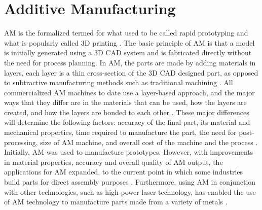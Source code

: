 \section{Additive Manufacturing}
\gls{AM} is the formalized termed for what used to be called rapid prototyping 
and what is popularly called 3D printing \cite{gibson_additive_2014}. 
The basic principle of \gls{AM} is that a model is initially generated using a
\gls{3D CAD} system and is fabricated directly without the need for process 
planning. 
In \gls{AM}, the parts are made by adding materials in layers, each layer is a 
thin cross-section of the \gls{3D CAD} designed part, as opposed 
to subtractive manufacturing methods such as traditional machining
\cite{standard_standard_2012}. 
All commercialized \gls{AM} machines to date use a layer-based approach, and 
the major ways that they differ are in the materials that can be used, 
how the layers are created, and how the layers are bonded to each other
\cite{gibson_additive_2014}.
These major differences will determine the following factors: accuracy of the 
final part, its material and mechanical properties, time required to manufacture 
the part, the need for post-processing, size of \gls{AM} machine, and overall 
cost of the machine and the process \cite{gibson_additive_2014}. 
Initially, \gls{AM} was used to manufacture prototypes. 
However, with improvements in material properties, accuracy and overall quality 
of \gls{AM} output, the applications for \gls{AM} expanded, to the 
current point in which some industries build parts for direct assembly purposes
\cite{uriondo_present_2015}.  
Furthermore, using \gls{AM} in conjunction with other technologies, such as 
high-power laser technology, has enabled the use of \gls{AM} technology 
to manufacture parts made from a variety of metals \cite{gibson_additive_2014}. 

